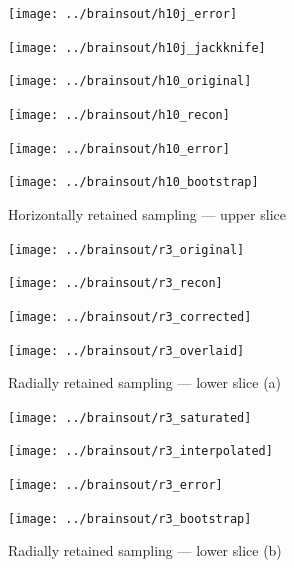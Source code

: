 \documentclass[article]{jdssv}
\begin{document}
\begin{figure}
\begin{centering}

\parbox{\imsize}{\texttt{[image: ../brainsout/h10j\_error]}}
\parbox{\imsize}{\texttt{[image: ../brainsout/h10j\_jackknife]}}

\vspace{\vertsep}

\parbox{\imsize}{\texttt{[image: ../brainsout/h10\_original]}}
\parbox{\imsize}{\texttt{[image: ../brainsout/h10\_recon]}}

\vspace{\vertsep}

\parbox{\imsize}{\texttt{[image: ../brainsout/h10\_error]}}
\parbox{\imsize}{\texttt{[image: ../brainsout/h10\_bootstrap]}}

\end{centering}
\caption{Horizontally retained sampling --- upper slice}
\label{bighorizontal}
\end{figure}


\begin{figure}
\begin{centering}

\parbox{\imsizes}{\texttt{[image: ../brainsout/r3\_original]}}
\hfill
\parbox{\imsizes}{\texttt{[image: ../brainsout/r3\_recon]}}

\vspace{\vertsep}

\parbox{\imsizes}{\texttt{[image: ../brainsout/r3\_corrected]}}
\hfill
\parbox{\imsizes}{\texttt{[image: ../brainsout/r3\_overlaid]}}

\end{centering}
\caption{Radially retained sampling --- lower slice (a)}
\label{first_viz}
\end{figure}


\begin{figure}
\begin{centering}

\parbox{\imsizes}{\texttt{[image: ../brainsout/r3\_saturated]}}
\hfill
\parbox{\imsizes}{\texttt{[image: ../brainsout/r3\_interpolated]}}

\vspace{\vertsep}

\parbox{\imsizes}{\texttt{[image: ../brainsout/r3\_error]}}
\hfill
\parbox{\imsizes}{\texttt{[image: ../brainsout/r3\_bootstrap]}}

\end{centering}
\caption{Radially retained sampling --- lower slice (b)}
\end{figure}
\end{document}
